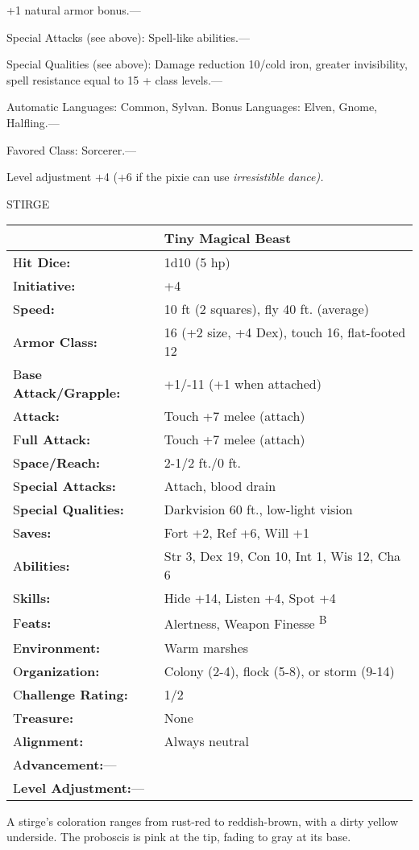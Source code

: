 \documentclass{article}
\begin{document}
\parindent=3pt
+1 natural armor bonus.---

\parindent=0pt
Special Attacks (see above): Spell-like abilities.---

Special Qualities (see above): Damage reduction 10/cold iron, greater invisibility, 
spell resistance equal to 15 + class levels.---

Automatic Languages: Common, Sylvan. Bonus Languages: Elven, Gnome, Halfling.---

Favored Class: Sorcerer.---

Level adjustment +4 (+6 if the pixie can use \textit{irresistible dance).}

\vspace{12pt}
{\LARGE{}STIRGE}

\begin{tabular}{|>{\raggedright}p{91pt}|>{\raggedright}p{180pt}|}
\hline
  & Tiny Magical Beast\tabularnewline
\hline
H\textbf{it Dice:} & 1d10 (5 hp)\tabularnewline
\hline
I\textbf{nitiative:} & +4\tabularnewline
\hline
S\textbf{peed:} & 10 ft (2 squares), fly 40 ft. (average)\tabularnewline
\hline
A\textbf{rmor Class:} & 16 (+2 size, +4 Dex), touch 16, flat-footed 12\tabularnewline
\hline
B\textbf{ase Attack/Grapple:} & +1/-11 (+1 when attached)\tabularnewline
\hline
A\textbf{ttack:} & Touch +7 melee (attach)\tabularnewline
\hline
F\textbf{ull Attack:} & Touch +7 melee (attach)\tabularnewline
\hline
S\textbf{pace/Reach:} & 2-1/2 ft./0 ft.\tabularnewline
\hline
S\textbf{pecial Attacks:} & Attach, blood drain\tabularnewline
\hline
S\textbf{pecial Qualities:} & Darkvision 60 ft., low-light vision\tabularnewline
\hline
S\textbf{aves:} & Fort +2, Ref +6, Will +1\tabularnewline
\hline
A\textbf{bilities:} & Str 3, Dex 19, Con 10, Int 1, Wis 12, Cha 6\tabularnewline
\hline
S\textbf{kills:} & Hide +14, Listen +4, Spot +4\tabularnewline
\hline
F\textbf{eats:} & Alertness, Weapon Finesse \textsuperscript{B}\tabularnewline
\hline
E\textbf{nvironment:} & Warm marshes\tabularnewline
\hline
O\textbf{rganization:} & Colony (2-4), flock (5-8), or storm (9-14)\tabularnewline
\hline
C\textbf{hallenge Rating:} & 1/2\tabularnewline
\hline
T\textbf{reasure:} & None\tabularnewline
\hline
A\textbf{lignment:} & Always neutral\tabularnewline
\hline
A\textbf{dvancement:}--- & \tabularnewline
\hline
L\textbf{evel Adjustment:}--- & \tabularnewline
\hline
\end{tabular}

A stirge's coloration ranges from rust-red to reddish-brown, with a dirty yellow 
underside. The proboscis is pink at the tip, fading to gray at its base.
\end{document}
